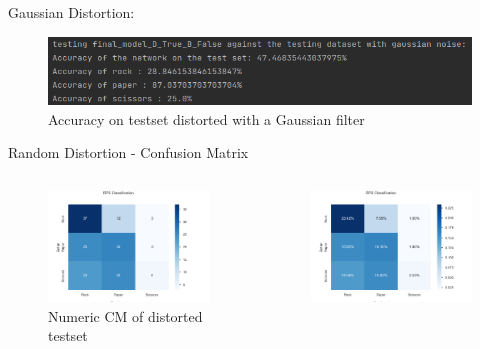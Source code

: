 \documentclass[aspectratio=169]{beamer}
\begin{document}
{	\begin{frame}
		Gaussian Distortion:
		\begin{figure}
			\centering
			\includegraphics[width=1\textwidth]{img/TestAccuracy_final_test_gauss.png}
			\caption{Accuracy on testset distorted with a Gaussian filter}
		\end{figure}   
	\end{frame}

	\begin{frame}{Random Distortion - Confusion Matrix}
		\begin{columns}
			\begin{column}{.5\textwidth}
				\begin{figure}
					\centering
					\includegraphics[width=1\textwidth]{img/CFM_final_test_rm_numeric.png}
					\caption{Numeric CM of distorted testset}
				\end{figure}      
			\end{column}
			\begin{column}{.5\textwidth}
				\begin{figure}
					\centering
					\includegraphics[width=\textwidth]{img/CFM_final_test_rm_percent.png}

\end{figure}
\end{column}
\end{columns}
\end{frame}}
\end{document}
